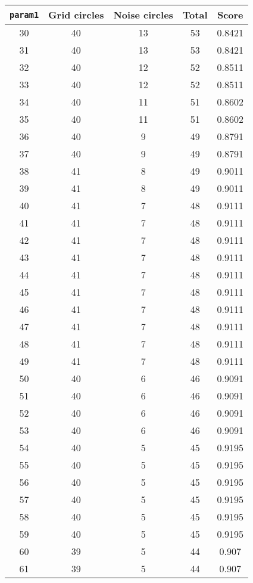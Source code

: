 \documentclass[letterpaper, 12pt]{article}
\begin{document}
\begin{longtable}{|c|c|c|c|c|}
\hline
\textbf{\texttt{param1}} & \textbf{Grid circles} & \textbf{Noise circles} & \textbf{Total} & \textbf{Score} \\
\hline
30 & 40 & 13 & 53 & 0.8421 \\
\hline
31 & 40 & 13 & 53 & 0.8421 \\
\hline
32 & 40 & 12 & 52 & 0.8511 \\
\hline
33 & 40 & 12 & 52 & 0.8511 \\
\hline
34 & 40 & 11 & 51 & 0.8602 \\
\hline
35 & 40 & 11 & 51 & 0.8602 \\
\hline
36 & 40 & 9 & 49 & 0.8791 \\
\hline
37 & 40 & 9 & 49 & 0.8791 \\
\hline
38 & 41 & 8 & 49 & 0.9011 \\
\hline
39 & 41 & 8 & 49 & 0.9011 \\
\hline
40 & 41 & 7 & 48 & 0.9111 \\
\hline
41 & 41 & 7 & 48 & 0.9111 \\
\hline
42 & 41 & 7 & 48 & 0.9111 \\
\hline
43 & 41 & 7 & 48 & 0.9111 \\
\hline
44 & 41 & 7 & 48 & 0.9111 \\
\hline
45 & 41 & 7 & 48 & 0.9111 \\
\hline
46 & 41 & 7 & 48 & 0.9111 \\
\hline
47 & 41 & 7 & 48 & 0.9111 \\
\hline
48 & 41 & 7 & 48 & 0.9111 \\
\hline
49 & 41 & 7 & 48 & 0.9111 \\
\hline
50 & 40 & 6 & 46 & 0.9091 \\
\hline
51 & 40 & 6 & 46 & 0.9091 \\
\hline
52 & 40 & 6 & 46 & 0.9091 \\
\hline
53 & 40 & 6 & 46 & 0.9091 \\
\hline
54 & 40 & 5 & 45 & 0.9195 \\
\hline
55 & 40 & 5 & 45 & 0.9195 \\
\hline
56 & 40 & 5 & 45 & 0.9195 \\
\hline
57 & 40 & 5 & 45 & 0.9195 \\
\hline
58 & 40 & 5 & 45 & 0.9195 \\
\hline
59 & 40 & 5 & 45 & 0.9195 \\
\hline
60 & 39 & 5 & 44 & 0.907 \\
\hline
61 & 39 & 5 & 44 & 0.907 \\

\end{longtable}
\end{document}
